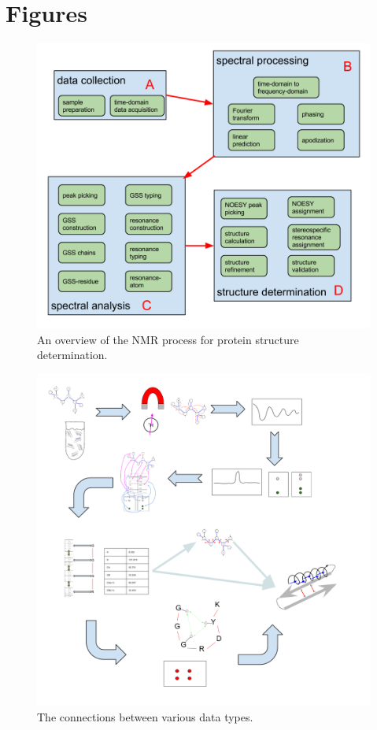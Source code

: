 \clearpage
\section{Figures}

\begin{figure}[h]
  \includegraphics[scale=0.42]{figures/nmr_overview}
  \caption{An overview of the NMR process for protein structure determination.}
  \label{nmr_overview}
\end{figure}

\begin{figure}
  \includegraphics[scale=0.35]{figures/process_timeline}
  \caption{The connections between various data types.}
  \label{process_timeline}
\end{figure}

